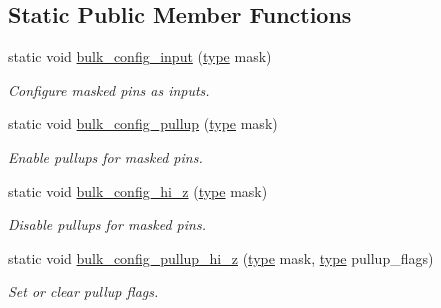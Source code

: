 \subsection*{Static Public Member Functions}
\begin{DoxyCompactItemize}
\item 
static void \hyperlink{structavrpp_1_1ports_1_1bulk__port__operations_ada34b26f1a5d9c8b504b40402d8f92f9}{bulk\_\-config\_\-input} (\hyperlink{structavrpp_1_1ports_1_1bulk__port__operations_a2a673fecf314e62c4c7a88fc63911ebb}{type} mask)
\begin{DoxyCompactList}\small\item\em Configure masked pins as inputs. \item\end{DoxyCompactList}\item 
static void \hyperlink{structavrpp_1_1ports_1_1bulk__port__operations_a684cd20e1df79be5a7dcda80fe8bbf58}{bulk\_\-config\_\-pullup} (\hyperlink{structavrpp_1_1ports_1_1bulk__port__operations_a2a673fecf314e62c4c7a88fc63911ebb}{type} mask)
\begin{DoxyCompactList}\small\item\em Enable pullups for masked pins. \item\end{DoxyCompactList}\item 
static void \hyperlink{structavrpp_1_1ports_1_1bulk__port__operations_a8dfb62f11b7847151b4fdfef289f3f0b}{bulk\_\-config\_\-hi\_\-z} (\hyperlink{structavrpp_1_1ports_1_1bulk__port__operations_a2a673fecf314e62c4c7a88fc63911ebb}{type} mask)
\begin{DoxyCompactList}\small\item\em Disable pullups for masked pins. \item\end{DoxyCompactList}\item 
static void \hyperlink{structavrpp_1_1ports_1_1bulk__port__operations_a270046c33a542adb9ad1f53a93c4f7f8}{bulk\_\-config\_\-pullup\_\-hi\_\-z} (\hyperlink{structavrpp_1_1ports_1_1bulk__port__operations_a2a673fecf314e62c4c7a88fc63911ebb}{type} mask, \hyperlink{structavrpp_1_1ports_1_1bulk__port__operations_a2a673fecf314e62c4c7a88fc63911ebb}{type} pullup\_\-flags)
\begin{DoxyCompactList}\small\item\em Set or clear pullup flags. \item\end{DoxyCompactList}\item 

\end{DoxyCompactItemize}
